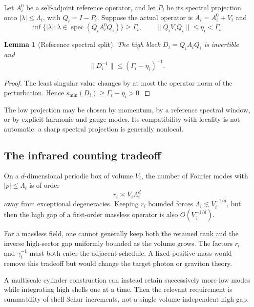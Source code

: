 \documentclass[11pt]{article}
\newtheorem{lemma}[theorem]{Lemma}
\begin{document}
Let \(A_i^0\) be a self-adjoint reference operator, and let \(P_i\) be
its spectral projection onto \(|\lambda|\le\Lambda_i\), with
\(Q_i=I-P_i\).  Suppose the actual operator is
\(A_i=A_i^0+V_i\) and
\[
             \inf\{|\lambda|:\lambda\in
               \operatorname{spec}(Q_iA_i^0Q_i)\}
                           \ge\Gamma_i,\qquad
             \lVert Q_iV_iQ_i\rVert\le\eta_i<\Gamma_i.       \tag{62.17}
\]

\begin{lemma}[Reference spectral split]
\label{lem:v11v62-reference}
The high block \(D_i=Q_iA_iQ_i\) is invertible and
\[
                         \lVert D_i^{-1}\rVert
                        \le(\Gamma_i-\eta_i)^{-1}.            \tag{62.18}
\]
\end{lemma}

\begin{proof}
The least singular value changes by at most the operator norm of the
perturbation.  Hence
\(s_{\min}(D_i)\ge\Gamma_i-\eta_i>0\).
\end{proof}

The low projection may be chosen by momentum, by a reference spectral
window, or by explicit harmonic and gauge modes.  Its compatibility
with locality is not automatic: a sharp spectral projection is
generally nonlocal.

\subsection{The infrared counting tradeoff}

On a \(d\)-dimensional periodic box of volume \(V_i\), the number of
Fourier modes with \(|p|\le\Lambda_i\) is of order
\[
                               r_i\asymp V_i\Lambda_i^d        \tag{62.19}
\]
away from exceptional degeneracies.  Keeping \(r_i\) bounded forces
\(\Lambda_i\lesssim V_i^{-1/d}\), but then the high gap of a
first-order massless operator is also \(O(V_i^{-1/d})\).

\begin{warning}
\label{warn:v11v62-balance}
For a massless field, one cannot generally keep both the retained rank
and the inverse high-sector gap uniformly bounded as the volume grows.
The factors \(r_i\) and \(\gamma_i^{-1}\) must both enter the adjacent
schedule.  A fixed positive mass would remove this tradeoff but would
change the target photon or graviton theory.
\end{warning}

A multiscale cylinder construction can instead retain successively
more low modes while integrating high shells one at a time.  Then the
relevant requirement is summability of shell Schur increments, not a
single volume-independent high gap.
\end{document}
